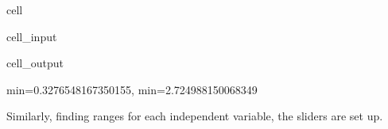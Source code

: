 \documentclass[letterpaper,10pt,english]{jupyterBook}
\begin{document}
\begin{sphinxuseclass}{cell}\begin{sphinxVerbatimInput}

\begin{sphinxuseclass}{cell_input}
\begin{sphinxVerbatim}[commandchars=\\\{\}]
  
  \PYG{p}{[}\PYG{p}{]}\PYG{p}{[}\PYG{p}{]}\PYG{p}{[}\PYG{p}{]}\PYG{p}{[}\PYG{p}{]}
  \PYG{p}{[}\PYG{p}{]}\PYG{p}{[}\PYG{p}{]}\PYG{p}{[}\PYG{p}{]}\PYG{p}{[}\PYG{p}{]}

 
\end{sphinxVerbatim}

\end{sphinxuseclass}\end{sphinxVerbatimInput}
\begin{sphinxVerbatimOutput}

\begin{sphinxuseclass}{cell_output}
\begin{sphinxVerbatim}[commandchars=\\\{\}]
min=\PYGZhy{}0.3276548167350155, min=2.724988150068349
\end{sphinxVerbatim}

\end{sphinxuseclass}\end{sphinxVerbatimOutput}

\end{sphinxuseclass}
\sphinxAtStartPar
Similarly, finding ranges for each independent variable, the sliders are set up.
\end{document}
